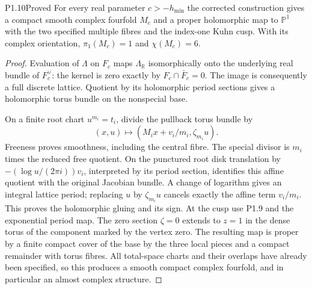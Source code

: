 \begin{statement}{P1.10}{Proved}
For every real parameter $c>-h_{\min}$ the corrected construction gives
a compact smooth complex fourfold $M_c$ and a proper holomorphic map
to $\mathbb P^1$ with the two specified multiple fibres and the
index-one Kuhn cusp.  With its complex orientation,
$\pi_1(M_c)=1$ and $\chi(M_c)=6$.
\end{statement}
\begin{proof}
Evaluation of $\Lambda$ on $F_c$ maps $\Lambda_{\mathbb R}$
isomorphically onto the underlying real bundle of $F_c^\vee$:
the kernel is zero exactly by $F_c\cap\bar F_c=0$.
The image is consequently a full discrete lattice.  Quotient by its
holomorphic period sections gives a holomorphic torus bundle on the
nonspecial base.

On a finite root chart $u^{m_i}=t_i$, divide the pullback torus bundle by
\[
(x,u)\longmapsto(M_ix+v_i/m_i,\zeta_{m_i}u).
\]
Freeness proves smoothness, including the central fibre.  The special
divisor is $m_i$ times the reduced free quotient.  On the punctured
root disk translation by
$-(\log u/(2\pi i))v_i$, interpreted by its period section, identifies
this affine quotient with the original Jacobian bundle.  A change of
logarithm gives an integral lattice period; replacing $u$ by
$\zeta_{m_i}u$ cancels exactly the affine term $v_i/m_i$.
This proves the holomorphic gluing and its sign.
At the cusp use P1.9 and the exponential period map.  The zero section
$\zeta=0$ extends to $z=1$ in the dense torus of the component marked
by the vertex zero.  The resulting map is proper by a finite compact
cover of the base by the three local pieces and a compact remainder
with torus fibres.  All total-space charts and their overlaps have
already been specified, so this produces a smooth compact complex
fourfold, and in particular an almost complex structure.


\end{proof}

